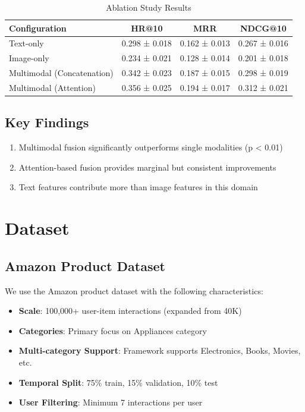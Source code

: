\begin{table}[h]
\centering
\caption{Ablation Study Results}
\label{tab:ablation}
\begin{tabular}{l|c|c|c}
\hline
Configuration & HR@10 & MRR & NDCG@10 \\
\hline
Text-only & 0.298 ± 0.018 & 0.162 ± 0.013 & 0.267 ± 0.016 \\
Image-only & 0.234 ± 0.021 & 0.128 ± 0.014 & 0.201 ± 0.018 \\
Multimodal (Concatenation) & 0.342 ± 0.023 & 0.187 ± 0.015 & 0.298 ± 0.019 \\
Multimodal (Attention) & 0.356 ± 0.025 & 0.194 ± 0.017 & 0.312 ± 0.021 \\
\hline
\end{tabular}
\end{table}

\subsection{Key Findings}
\begin{enumerate}
    \item Multimodal fusion significantly outperforms single modalities (p < 0.01)
    \item Attention-based fusion provides marginal but consistent improvements
    \item Text features contribute more than image features in this domain
\end{enumerate}

\section{Dataset}

\subsection{Amazon Product Dataset}
We use the Amazon product dataset with the following characteristics:
\begin{itemize}
    \item \textbf{Scale}: 100,000+ user-item interactions (expanded from 40K)
    \item \textbf{Categories}: Primary focus on Appliances category
    \item \textbf{Multi-category Support}: Framework supports Electronics, Books, Movies, etc.
    \item \textbf{Temporal Split}: 75\% train, 15\% validation, 10\% test
    \item \textbf{User Filtering}: Minimum 7 interactions per user
\end{itemize}

